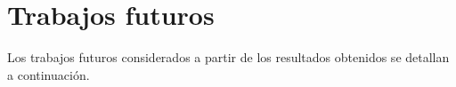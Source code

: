 
\section{Trabajos futuros}

Los trabajos futuros considerados a partir de los resultados obtenidos se detallan a continuación.

